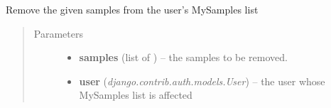 \documentclass[a4paper,11pt,english]{sphinxmanual}
\begin{document}

\begin{fulllineitems}
\label{programming/utilities:samples.utils.views.remove_samples_from_my_samples}
Remove the given samples from the user's MySamples list
\begin{quote}\begin{description}
\item[{Parameters}] \leavevmode\begin{itemize}
\item {} 
\textbf{samples} (list of ) -- the samples to be removed.

\item {} 
\textbf{user} (\emph{django.contrib.auth.models.User}) -- the user whose MySamples list is affected

\end{itemize}

\end{description}\end{quote}

\end{fulllineitems}

\end{document}

